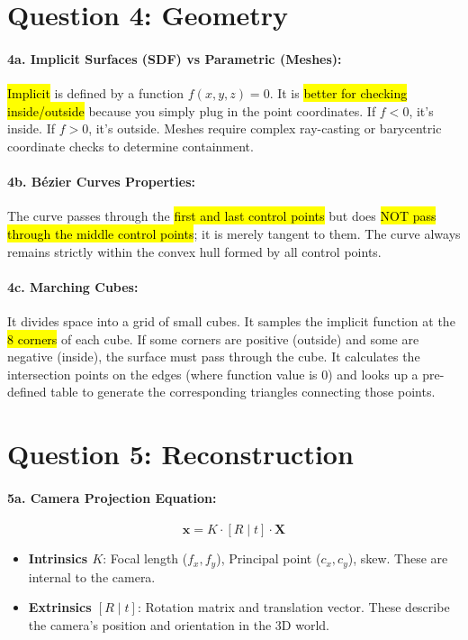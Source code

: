 \documentclass[11pt]{article}
\begin{document}
\section*{Question 4: Geometry}

\paragraph{4a. Implicit Surfaces (SDF) vs Parametric (Meshes):}
\hl{Implicit} is defined by a function $f(x,y,z)=0$. It is \hl{better for checking inside/outside} because you simply plug in the point coordinates. If $f < 0$, it's inside. If $f > 0$, it's outside. Meshes require complex ray-casting or barycentric coordinate checks to determine containment.

\paragraph{4b. Bézier Curves Properties:}
The curve passes through the \hl{first and last control points} but does \hl{NOT pass through the middle control points}; it is merely tangent to them. The curve always remains strictly within the convex hull formed by all control points.

\paragraph{4c. Marching Cubes:}
It divides space into a grid of small cubes. It samples the implicit function at the \hl{8 corners} of each cube. If some corners are positive (outside) and some are negative (inside), the surface must pass through the cube. It calculates the intersection points on the edges (where function value is 0) and looks up a pre-defined table to generate the corresponding triangles connecting those points.

\section*{Question 5: Reconstruction}

\paragraph{5a. Camera Projection Equation:}
\[ \mathbf{x} = K \cdot [R \mid t] \cdot \mathbf{X} \]
\begin{itemize}
    \item \textbf{Intrinsics $K$}: Focal length ($f_x, f_y$), Principal point ($c_x, c_y$), skew. These are internal to the camera.
    \item \textbf{Extrinsics $[R \mid t]$}: Rotation matrix and translation vector. These describe the camera's position and orientation in the 3D world.
\end{itemize}
\end{document}
